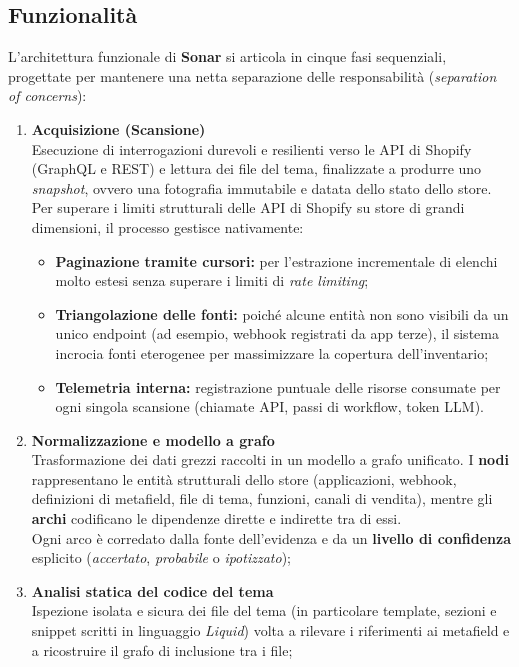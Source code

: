 \subsection{Funzionalità}
L'architettura funzionale di \textbf{Sonar} si articola in cinque fasi sequenziali, progettate per mantenere una netta separazione delle responsabilità (\textit{separation of concerns}):
\begin{enumerate}
    \item \textbf{Acquisizione (Scansione)}\\
    Esecuzione di interrogazioni durevoli e resilienti verso le API di Shopify (GraphQL e REST) e lettura dei file del tema, finalizzate a produrre uno \textit{snapshot}, ovvero una fotografia immutabile e datata dello stato dello store. \\
    Per superare i limiti strutturali delle API di Shopify su store di grandi dimensioni, il processo gestisce nativamente:
    \begin{itemize}
        \item \textbf{Paginazione tramite cursori:} per l'estrazione incrementale di elenchi molto estesi senza superare i limiti di \textit{rate limiting};
        \item \textbf{Triangolazione delle fonti:} poiché alcune entità non sono visibili da un unico endpoint (ad esempio, webhook registrati da app terze), il sistema incrocia fonti eterogenee per massimizzare la copertura dell'inventario;
        \item \textbf{Telemetria interna:} registrazione puntuale delle risorse consumate per ogni singola scansione (chiamate API, passi di workflow, token LLM).
    \end{itemize}
    \item \textbf{Normalizzazione e modello a grafo} \\
    Trasformazione dei dati grezzi raccolti in un modello a grafo unificato. I \textbf{nodi} rappresentano le entità strutturali dello store (applicazioni, webhook, definizioni di metafield, file di tema, funzioni, canali di vendita), mentre gli \textbf{archi} codificano le dipendenze dirette e indirette tra di essi. \\
    Ogni arco è corredato dalla fonte dell'evidenza e da un \textbf{livello di confidenza} esplicito (\textit{accertato}, \textit{probabile} o \textit{ipotizzato});
    \item \textbf{Analisi statica del codice del tema}\\
    Ispezione isolata e sicura dei file del tema (in particolare template, sezioni e snippet scritti in linguaggio \textit{Liquid}) volta a rilevare i riferimenti ai metafield e a ricostruire il grafo di inclusione tra i file;

\end{enumerate}
